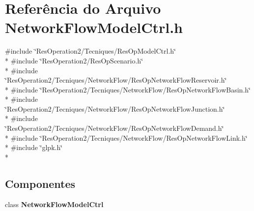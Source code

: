 \section{Referência do Arquivo Network\+Flow\+Model\+Ctrl.\+h}
\label{_network_flow_model_ctrl_8h}
{\ttfamily \#include \char`\"{}Res\+Operation2/\+Tecniques/\+Res\+Op\+Model\+Ctrl.\+h\char`\"{}}\\*
{\ttfamily \#include \char`\"{}Res\+Operation2/\+Res\+Op\+Scenario.\+h\char`\"{}}\\*
{\ttfamily \#include \char`\"{}Res\+Operation2/\+Tecniques/\+Network\+Flow/\+Res\+Op\+Network\+Flow\+Reservoir.\+h\char`\"{}}\\*
{\ttfamily \#include \char`\"{}Res\+Operation2/\+Tecniques/\+Network\+Flow/\+Res\+Op\+Network\+Flow\+Basin.\+h\char`\"{}}\\*
{\ttfamily \#include \char`\"{}Res\+Operation2/\+Tecniques/\+Network\+Flow/\+Res\+Op\+Network\+Flow\+Junction.\+h\char`\"{}}\\*
{\ttfamily \#include \char`\"{}Res\+Operation2/\+Tecniques/\+Network\+Flow/\+Res\+Op\+Network\+Flow\+Demand.\+h\char`\"{}}\\*
{\ttfamily \#include \char`\"{}Res\+Operation2/\+Tecniques/\+Network\+Flow/\+Res\+Op\+Network\+Flow\+Link.\+h\char`\"{}}\\*
{\ttfamily \#include \char`\"{}glpk.\+h\char`\"{}}\\*
\subsection*{Componentes}
\begin{DoxyCompactItemize}
\item 
class {\bf Network\+Flow\+Model\+Ctrl}
\end{DoxyCompactItemize}
